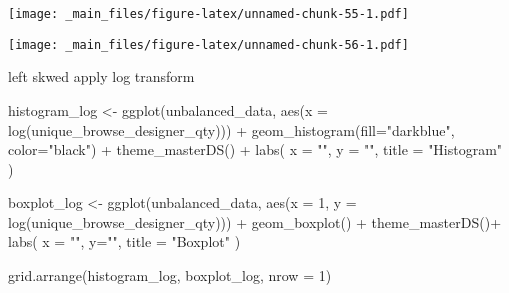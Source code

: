 \documentclass[
]{book}
\newenvironment{Shaded}{\begin{snugshade}}{\end{snugshade}}
\newcommand{\AttributeTok}[1]{\textcolor[rgb]{0.77,0.63,0.00}{#1}}
\newcommand{\DecValTok}[1]{\textcolor[rgb]{0.00,0.00,0.81}{#1}}
\newcommand{\FunctionTok}[1]{\textcolor[rgb]{0.00,0.00,0.00}{#1}}
\newcommand{\NormalTok}[1]{#1}
\newcommand{\OtherTok}[1]{\textcolor[rgb]{0.56,0.35,0.01}{#1}}
\newcommand{\SpecialCharTok}[1]{\textcolor[rgb]{0.00,0.00,0.00}{#1}}
\newcommand{\StringTok}[1]{\textcolor[rgb]{0.31,0.60,0.02}{#1}}
\begin{document}
\begin{Shaded}
\end{Shaded}

\texttt{[image: \_main\_files/figure-latex/unnamed-chunk-55-1.pdf]}

\begin{Shaded}
\end{Shaded}

\texttt{[image: \_main\_files/figure-latex/unnamed-chunk-56-1.pdf]}

left skwed apply log transform

\begin{Shaded}
\begin{Highlighting}[]
\NormalTok{ histogram\_log }\OtherTok{\textless{}{-}} \FunctionTok{ggplot}\NormalTok{(unbalanced\_data, }\FunctionTok{aes}\NormalTok{(}\AttributeTok{x =} \FunctionTok{log}\NormalTok{(unique\_browse\_designer\_qty))) }\SpecialCharTok{+}
    \FunctionTok{geom\_histogram}\NormalTok{(}\AttributeTok{fill=}\StringTok{"darkblue"}\NormalTok{, }\AttributeTok{color=}\StringTok{"black"}\NormalTok{) }\SpecialCharTok{+}
    \FunctionTok{theme\_masterDS}\NormalTok{() }\SpecialCharTok{+}
    \FunctionTok{labs}\NormalTok{(}
      \AttributeTok{x =} \StringTok{""}\NormalTok{,}
      \AttributeTok{y =} \StringTok{""}\NormalTok{,}
      \AttributeTok{title =} \StringTok{"Histogram"}
\NormalTok{    )}
  
\NormalTok{  boxplot\_log }\OtherTok{\textless{}{-}} \FunctionTok{ggplot}\NormalTok{(unbalanced\_data, }\FunctionTok{aes}\NormalTok{(}\AttributeTok{x =} \DecValTok{1}\NormalTok{, }\AttributeTok{y =} \FunctionTok{log}\NormalTok{(unique\_browse\_designer\_qty))) }\SpecialCharTok{+}
    \FunctionTok{geom\_boxplot}\NormalTok{() }\SpecialCharTok{+}
    \FunctionTok{theme\_masterDS}\NormalTok{()}\SpecialCharTok{+}
    \FunctionTok{labs}\NormalTok{(}
      \AttributeTok{x =} \StringTok{""}\NormalTok{,}
      \AttributeTok{y=}\StringTok{""}\NormalTok{,}
      \AttributeTok{title =} \StringTok{"Boxplot"}
\NormalTok{    )}

  \FunctionTok{grid.arrange}\NormalTok{(histogram\_log, boxplot\_log, }\AttributeTok{nrow =} \DecValTok{1}\NormalTok{)}
\end{Highlighting}
\end{Shaded}
\end{document}
